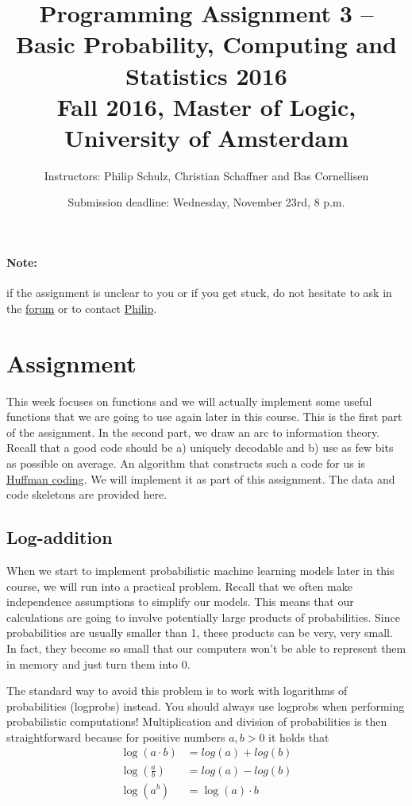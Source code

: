 \documentclass[11pt, leqno, a4paper]{article}
\title{Programming Assignment 3 -- Basic Probability, Computing and Statistics 2016 \\[2mm]
\large{Fall 2016, Master of Logic, University of Amsterdam}}
\author{Instructors: Philip Schulz, Christian Schaffner and Bas Cornellisen}
\date{Submission deadline: Wednesday, November 23rd, 8 p.m.}
\begin{document}
\maketitle

\paragraph{Note:} if the assignment is unclear to you or if you get
stuck, do not hesitate to ask in the
\href{https://www.moodle.ch/lms/mod/forum/view.php?id=1721}{forum} or
to contact
\href{mailto:P.Schulz@uva.nl}{Philip}.

\section{Assignment}

This week focuses on functions and we will actually implement some useful functions that we are going to use again later in this course. This is 
the first part of the assignment. In the second part, we draw an arc to information theory. Recall that a good code should be a) uniquely decodable
and b) use as few bits as possible on average. An algorithm that constructs such a code for us is \href{https://en.wikipedia.org/wiki/Huffman_coding}{Huffman coding}.
We will implement it as part of this assignment. The data and code skeletons are provided here.

\subsection{Log-addition}

When we start to implement probabilistic machine learning models later in this course, we will run into a practical problem. Recall that we often make 
independence assumptions to simplify our models. This means that our calculations are going to involve potentially large products of probabilities. Since
probabilities are usually smaller than 1, these products can be very, very small. In fact, they become so small that our computers won't be able to 
represent them in memory and just turn them into 0.

The standard way to avoid this problem is to work with logarithms of probabilities (logprobs) instead. You should always use logprobs when performing
probabilistic computations! Multiplication and division of probabilities is then straightforward because for positive numbers $ a,b > 0 $ it holds that
\begin{align*}
\log(a \cdot b) &= log(a) + log(b) \\
\log\left( \frac{a}{b} \right) &= log(a) - log(b) \\
\log\left( a^{b} \right) &= \log(a) \cdot b
\end{align*}
\end{document}

